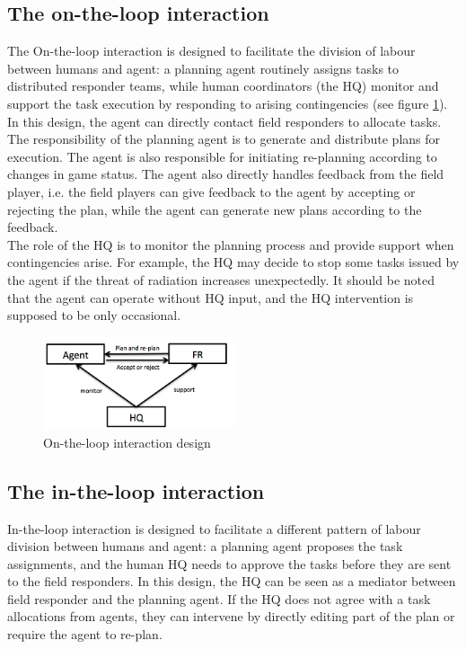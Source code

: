 \subsection{The on-the-loop interaction}
The On-the-loop interaction is designed to facilitate the division of labour between humans and agent: a planning agent routinely assigns tasks to distributed responder teams, while human coordinators (the HQ) monitor and support the task execution by responding to arising contingencies (see figure \ref{fig:OnTheLoop}). In this design, the agent can directly contact field responders to allocate tasks. The responsibility of the planning agent is to generate and distribute plans for execution. The agent is also responsible for initiating re-planning according to changes in game status. The agent also directly handles feedback from the field player, i.e. the field players can give feedback to the agent by accepting or rejecting the plan, while the agent can generate new plans according to the feedback. \\

The role of the HQ is to monitor the planning process and provide support when contingencies arise. For example, the HQ may decide to stop some tasks issued by the agent if the threat of radiation increases unexpectedly. It should be noted that the agent can operate without HQ input, and the HQ intervention is supposed to be only occasional. \\

\begin{figure}[h]
  \centering
  \includegraphics[width=0.5\textwidth]{img/approach/OnTheLoop}
  \caption{On-the-loop interaction design}
  \label{fig:OnTheLoop}
\end{figure}

\subsection{The in-the-loop interaction}
In-the-loop interaction is designed to facilitate a different pattern of labour division between humans and agent: a planning agent proposes the task assignments, and the human HQ needs to approve the tasks before they are sent to the field responders. In this design, the HQ can be seen as a mediator between field responder and the planning agent. If the HQ does not agree with a task allocations from agents, they can intervene by directly editing part of the plan or require the agent to re-plan. \\

